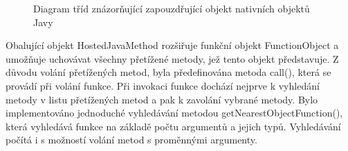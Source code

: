 \begin{figure}[H]
  \begin{center}
    \caption{Diagram tříd znázorňující zapouzdřující objekt nativních objektů Javy}
    \label{Figure.HostedJavaObject}
  \end{center}
\end{figure}

Obalující objekt HostedJavaMethod rozšiřuje funkční objekt FunctionObject a umožňuje uchovávat všechny přetížené metody, jež tento objekt představuje. Z důvodu volání přetížených metod, byla předefinována metoda call(), která se provádí při volání funkce. Při invokaci funkce dochází nejprve k vyhledání metody v listu přetížených metod a pak k zavolání vybrané metody. Bylo implementováno jednoduché vyhledávání metodou getNearestObjectFunction(), která vyhledává funkce na základě počtu argumentů a jejich typů. Vyhledávání počítá i s možností volání metod s proměnnými argumenty.

